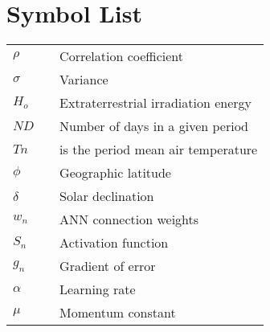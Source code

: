 \chapter*{Symbol List}

\vspace*{-0.5cm}

\onehalfspacing


\noindent
\begin{tabular}{l c p{.85\linewidth}}
$\rho$             & & Correlation coefficient\\

$\sigma$           & & Variance\\

$H_o$              & & Extraterrestrial irradiation energy\\
    
$ND$               & & Number of days in a given period\\ 

$Tn$               & & is the period mean air temperature\\

$\phi$             & & Geographic latitude\\

$\delta$          & & Solar declination \\

$w_n$              & & ANN connection weights \\

$S_n$              & & Activation function\\

$g_n$            && Gradient of error\\

$\alpha$        && Learning rate\\

$\mu$            && Momentum constant\\

\end{tabular}
